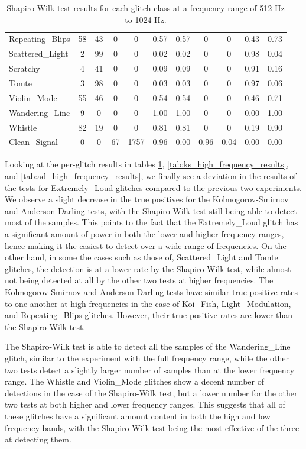 \documentclass[12pt]{article}
\begin{document}
\begin{table}[H]
\begin{tabular}{lcccccccccc}
  Repeating\_Blips & 58 & 43 & 0 & 0 & 0.57 & 0.57 & 0 & 0 & 0.43 & 0.73 \\
  Scattered\_Light & 2 & 99 & 0 & 0 & 0.02 & 0.02 & 0 & 0 & 0.98 & 0.04 \\
  Scratchy & 4 & 41 & 0 & 0 & 0.09 & 0.09 & 0 & 0 & 0.91 & 0.16 \\
  Tomte & 3 & 98 & 0 & 0 & 0.03 & 0.03 & 0 & 0 & 0.97 & 0.06 \\
  Violin\_Mode & 55 & 46 & 0 & 0 & 0.54 & 0.54 & 0 & 0 & 0.46 & 0.71 \\
  Wandering\_Line & 9 & 0 & 0 & 0 & 1.00 & 1.00 & 0 & 0 & 0.00 & 1.00 \\
  Whistle & 82 & 19 & 0 & 0 & 0.81 & 0.81 & 0 & 0 & 0.19 & 0.90 \\
  Clean\_Signal & 0 & 0 & 67 & 1757 & 0.96 & 0.00 & 0.96 & 0.04 & 0.00 & 0.00 \\
  \bottomrule
  \end{tabular}
  \caption{Shapiro-Wilk test results for each glitch class at a frequency range of 512 Hz to 1024 Hz.}
  \label{tab:shapiro_high_frequency_results}
\end{table}

\noindent Looking at the per-glitch results in tables \ref{tab:shapiro_high_frequency_results}, \ref{tab:ks_high_frequency_results}, and \ref{tab:ad_high_frequency_results}, we finally see a deviation in the results of the tests for Extremely\_Loud glitches compared to the previous two experiments. We observe a slight decrease in the true positives for the Kolmogorov-Smirnov and Anderson-Darling tests, with the Shapiro-Wilk test still being able to detect most of the samples. This points to the fact that the Extremely\_Loud glitch has a significant amount of power in both the lower and higher frequency ranges, hence making it the easiest to detect over a wide range of frequencies. On the other hand, in some the cases such as those of, Scattered\_Light and Tomte glitches, the detection is at a lower rate by the Shapiro-Wilk test, while almost not being detected at all by the other two tests at higher frequencies. The Kolmogorov-Smirnov and Anderson-Darling tests have similar true positive rates to one another at high frequencies in the case of Koi\_Fish, Light\_Modulation, and Repeating\_Blips glitches. However, their true positive rates are lower than the Shapiro-Wilk test.

\pagebreak
\noindent The Shapiro-Wilk test is able to detect all the samples of the Wandering\_Line glitch, similar to the experiment with the full frequency range, while the other two tests detect a slightly larger number of samples than at the lower frequency range. The Whistle and Violin\_Mode glitches show a decent number of detections in the case of the Shapiro-Wilk test, but a lower number for the other two tests at both higher and lower frequency ranges. This suggests that all of these glitches have a significant amount content in both the high and low frequency bands, with the Shapiro-Wilk test being the most effective of the three at detecting them.
\end{document}
